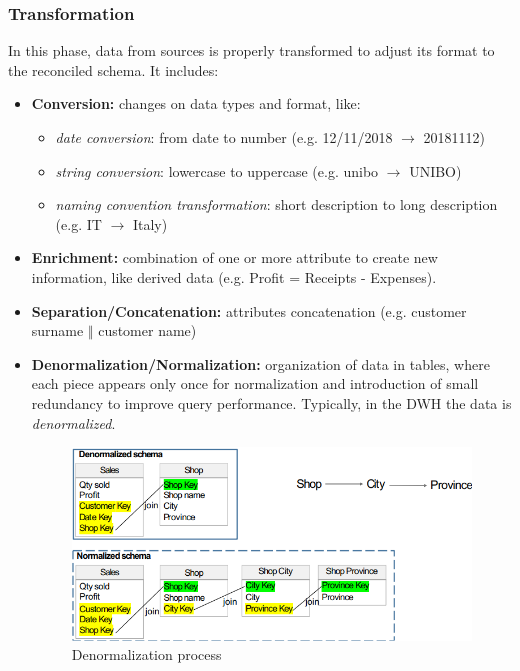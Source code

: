 \subsubsection{Transformation}
In this phase, data from sources is properly transformed to adjust its format to the reconciled schema. It includes:
\begin{itemize}
    \item \textbf{Conversion:} changes on data
    types and format, like:
    \begin{itemize}
        \item \textit{date conversion}: from date to number (e.g. 12/11/2018 $\longrightarrow$ 20181112)
        \item \textit{string conversion}: lowercase to uppercase (e.g. unibo $\longrightarrow$ UNIBO)
        \item \textit{naming convention transformation}: short description to long
        description (e.g. IT $\longrightarrow$ Italy)
    \end{itemize}
    \item \textbf{Enrichment:} combination of one or more attribute to create new information, like derived data (e.g. Profit = Receipts - Expenses).
    \item \textbf{Separation/Concatenation:} attributes concatenation (e.g. customer surname $\Vert$ customer name)
    \item \textbf{Denormalization/Normalization:} organization of data in tables, where each piece appears only once for normalization and introduction of small redundancy to improve query performance. Typically, in the DWH the data is \textit{denormalized}.
    \begin{figure}[ht!]
        \centering
        \includegraphics[scale=0.8]{images/ETL_denormalization.png}
        \caption{Denormalization process}
    \end{figure}
\end{itemize}

